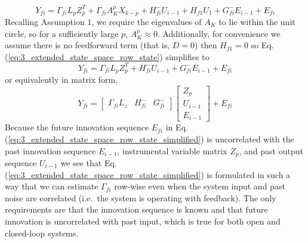 \begin{equation}\label{eq:3_extended_state_space_row_state}
Y_{fi} = \Gamma_{fi}L_p Z_p^T + \Gamma_{fi}A_{K}^p X_{k-p} + H_{fi}^- U_{i-1} + H_{f1}U_1 + G_{fi}^- E_{i-1} + E_{fi}
\end{equation}
Recalling Assumption 1, we require the eigenvalues of $A_K$ to lie within the unit circle, so for a sufficiently large $p$, $A_K^p \approx 0$. Additionally, for convenience we assume there is no feedforward term (that is, $D = 0$) then $H_{f1} = 0$ so Eq. (\ref{eq:3_extended_state_space_row_state}) simplifies to
\begin{equation}\label{eq:3_extended_state_space_row_state_simplified}
Y_{fi} = \Gamma_{fi}L_p Z_p^T + H_{fi}^- U_{i-1} + G_{fi}^- E_{i-1} + E_{fi}
\end{equation}
or equivalently in matrix form,
\begin{equation}\label{eq:3_extended_state_space_row_state_matrix}
Y_{fi} = \begin{bmatrix}\Gamma_{fi}L_z & H_{fi}^- & G_{fi}^-\end{bmatrix}
\begin{bmatrix}Z_p\\ U_{i-1}\\ E_{i-1}\end{bmatrix} + E_{fi}
\end{equation}
Because the future innovation sequence $E_{fi}$ in Eq. (\ref{eq:3_extended_state_space_row_state_simplified}) is uncorrelated with the past innovation sequence $E_{i-1}$, instrumental variable matrix $Z_p$, and past output sequence $U_{i-1}$ we see that Eq. (\ref{eq:3_extended_state_space_row_state_simplified}) is formulated in such a way that we can estimate $\Gamma_{fi}$ row-wise even when the system input and past noise are correlated (i.e.\ the system is operating with feedback). The only requirements are that the innovation sequence is known and that future innovation is uncorrelated with past input, which is true for both open and closed-loop systems. 

